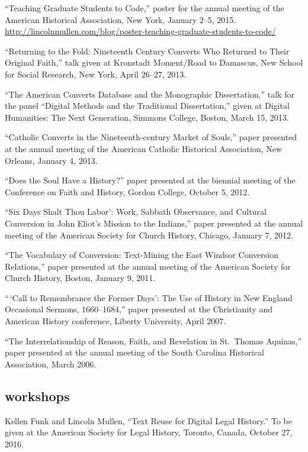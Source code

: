 \documentclass[11pt]{article}
\begin{document}
``Teaching Graduate Students to Code,'' poster for the annual meeting of the
American Historical Association, New York, January 2--5, 2015.
\url{http://lincolnmullen.com/blog/poster-teaching-graduate-students-to-code/}

``Returning to the Fold: Nineteenth Century Converts Who Returned to
Their Original Faith,'' talk given at Kronstadt Moment/Road to Damascus,
New School for Social Research, New York, April 26--27, 2013.

``The American Converts Database and the Monographic Dissertation,''
talk for the panel ``Digital Methods and the Traditional Dissertation,''
given at Digital Humanities: The Next Generation, Simmons College,
Boston, March 15, 2013.

``Catholic Converts in the Nineteenth-century Market of Souls,'' paper
presented at the annual meeting of the American Catholic Historical
Association, New Orleans, January 4, 2013.

``Does the Soul Have a History?'' paper presented at the biennial
meeting of the Conference on Faith and History, Gordon College, October
5, 2012.

``Six Days Shalt Thou Labor': Work, Sabbath Observance, and Cultural
Conversion in John Eliot's Mission to the Indians,'' paper presented at
the annual meeting of the American Society for Church History, Chicago,
January 7, 2012.

``The Vocabulary of Conversion: Text-Mining the East Windsor Conversion
Relations,'' paper presented at the annual meeting of the American
Society for Church History, Boston, January 9, 2011.

``\,`Call to Remembrance the Former Days': The Use of History in New
England Occasional Sermons, 1660--1684,'' paper presented at the
Christianity and American History conference, Liberty University, April
2007.

``The Interrelationship of Reason, Faith, and Revelation in St.~Thomas
Aquinas,'' paper presented at the annual meeting of the South Carolina
Historical Association, March 2006.

\subsection{workshops}\label{workshops}

Kellen Funk and Lincoln Mullen, ``Text Reuse for Digital Legal History.'' To be given at the American Society for Legal History, Toronto, Canada, October 27, 2016.
\end{document}
